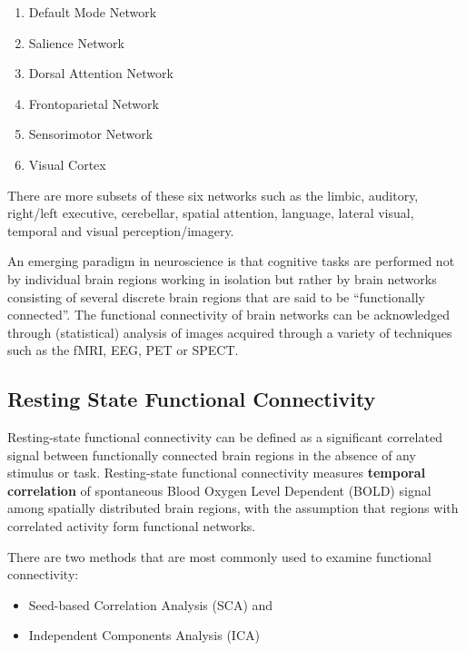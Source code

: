 \documentclass{article}
\begin{document}
\begin{enumerate}[nosep]
  \item Default Mode Network
  \item Salience Network
  \item Dorsal Attention Network
  \item Frontoparietal Network
  \item Sensorimotor Network
  \item Visual Cortex
\end{enumerate}

There are more subsets of these six networks such as the limbic,
auditory, right/left executive, cerebellar, spatial attention,
language, lateral visual, temporal and visual perception/imagery.

An emerging paradigm in neuroscience is that cognitive tasks are
performed not by individual brain regions working in isolation but
rather by brain networks consisting of several discrete brain regions
that are said to be ``functionally connected''. The functional
connectivity of brain networks can be acknowledged through
(statistical) analysis of images acquired through a variety of
techniques such as the fMRI, EEG, PET or SPECT.


\subsection{Resting State Functional Connectivity}

Resting-state functional connectivity can be defined as a %
significant correlated signal between functionally connected brain
regions in the absence of any stimulus or task. Resting-state
functional connectivity measures \textbf{temporal correlation} of
spontaneous Blood Oxygen Level Dependent (BOLD) signal among spatially
distributed brain regions, with the assumption that regions with
correlated activity form functional networks.

There are two methods that are most commonly used to examine
functional connectivity:
\begin{itemize}[nosep]
  \item Seed-based Correlation Analysis (SCA) and
  \item Independent Components Analysis (ICA)
\end{itemize}
\end{document}
